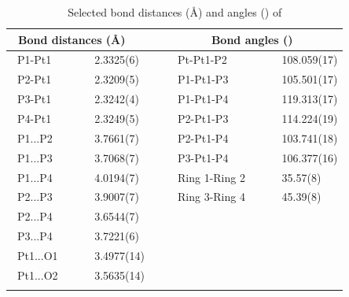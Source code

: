 \begin{table}[htp]
\caption[Selected bond distances (\AA) and angles (\degrees) of \ce{[Pt(Ph-thixantphos)2]}]{Selected bond distances (\AA) and angles (\degrees) of \ce{[Pt(Ph-thixantphos)2]}}
\vspace{1em}
\label{table:crystalbisthixantphosplatinum:lengths}
\small
\begin{center}
\begin{tabular}{l l l l}
	\toprule
	\multicolumn{2}{l}{\bfseries{~Bond distances (\si{\angstrom})}} & \multicolumn{2}{c}{\bfseries{Bond angles (\degrees)}} \\
	\midrule		
	~P1-Pt1		~~&~~2.3325(6)~~	&~~Pt-Pt1-P2		~~	&~~108.059(17)	\\
	~P2-Pt1		~~&~~2.3209(5)~~	&~~P1-Pt1-P3		~~	&~~105.501(17)	\\
	~P3-Pt1		~~&~~2.3242(4)~~	&~~P1-Pt1-P4		~~	&~~119.313(17)	\\
	~P4-Pt1		~~&~~2.3249(5)~~	&~~P2-Pt1-P3		~~	&~~114.224(19)	\\
	~P1...P2		~~&~~3.7661(7)~~	&~~P2-Pt1-P4		~~	&~~103.741(18)	\\
	~P1...P3		~~&~~3.7068(7)~~	&~~P3-Pt1-P4		~~	&~~106.377(16)	\\
	~P1...P4		~~&~~4.0194(7)~~	&~~Ring 1-Ring 2	~~	&~~35.57(8)		\\
	~P2...P3		~~&~~3.9007(7)~~	&~~Ring 3-Ring 4	~~	&~~45.39(8)		\\
	~P2...P4		~~&~~3.6544(7)~~	&~~				~~	&~~				\\
	~P3...P4		~~&~~3.7221(6)~~	&~~				~~	&~~				\\
	~Pt1...O1		~~&~~3.4977(14)~~	&~~				~~	&~~				\\
	~Pt1...O2		~~&~~3.5635(14)~~	&~~				~~	&~~				\\
	\bottomrule{}
\end{tabular}
\end{center}
\end{table}


